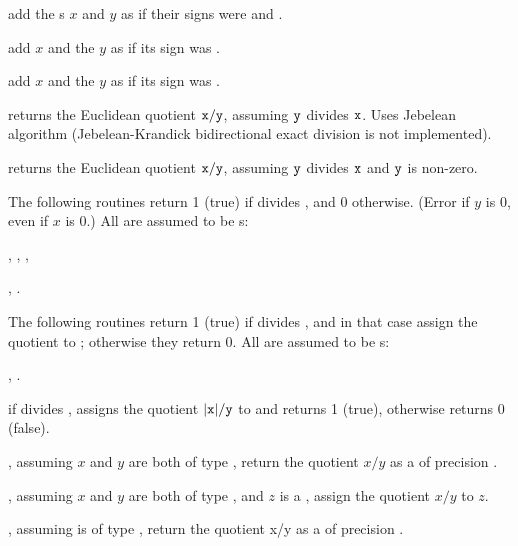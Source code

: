  add the s $x$
and $y$ as if their signs were  and .

 add $x$ and the  $y$
as if its sign was .

 add $x$ and the  $y$
as if its sign was .


 returns the Euclidean quotient
${\tt x} / {\tt y}$, assuming ${\tt y}$ divides ${\tt x}$. Uses Jebelean
algorithm (Jebelean-Krandick bidirectional exact division is not
implemented).

 returns the Euclidean quotient
${\tt x} / {\tt y}$, assuming ${\tt y}$ divides
${\tt x}$ and ${\tt y}$ is non-zero.

The following routines return 1 (true) if  divides , and
0 otherwise. (Error if $y$ is $0$, even if $x$ is $0$.) All  are
assumed to be s:

,
,
,

,
.

The following routines return 1 (true) if  divides , and in
that case assign the quotient to ; otherwise they return 0. All
 are assumed to be s:

,
.

 if  divides , assigns
the quotient $|{\tt x}|/{\tt y}$ to  and returns 1 (true), otherwise
returns 0 (false).


, assuming $x$ and $y$
are both of type , return the quotient $x/y$ as a  of
precision .

, assuming $x$ and $y$
are both of type , and $z$ is a ,
assign the quotient $x/y$ to $z$.

, assuming 
is of type , return the quotient x/y as a  of
precision .

